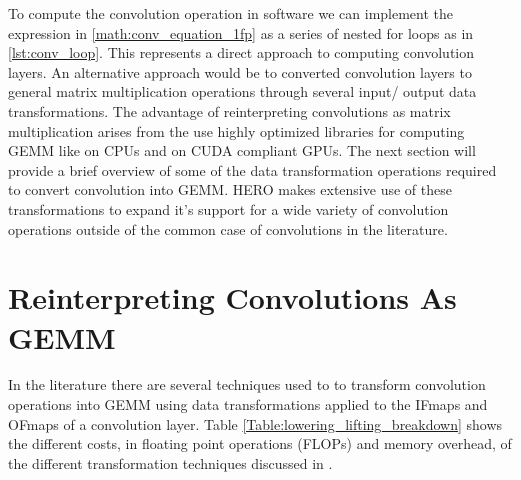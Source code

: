 To compute the convolution operation in software we can implement the expression
in \autoref{math:conv_equation_1fp} as a series of nested for loops as in
\autoref{lst:conv_loop}. This represents a direct approach to computing
convolution layers. An alternative approach would be to converted convolution
layers to general matrix multiplication operations through several input/ output
data transformations. The advantage of reinterpreting convolutions as matrix
multiplication arises from the use highly optimized libraries for computing GEMM
like \cite{blas} on CPUs and \cite{cuBLAS} on CUDA compliant GPUs. The next
section will provide a brief overview of some of the data transformation
operations required to convert convolution into GEMM. HERO makes extensive use
of these transformations to expand it's support for a wide variety of
convolution operations outside of the common case of convolutions in the
literature. 


\clearpage
    
\section{Reinterpreting Convolutions As GEMM}

In the literature
\cite{cafe_con_troll} there
are several techniques used to to transform convolution operations into GEMM
using data transformations applied to the IFmaps and OFmaps of a convolution layer.
Table \ref{Table:lowering_lifting_breakdown} shows the different costs, in
floating point operations (FLOPs) and memory overhead, of the different
transformation techniques discussed in \cite{cafe_con_troll}. 

